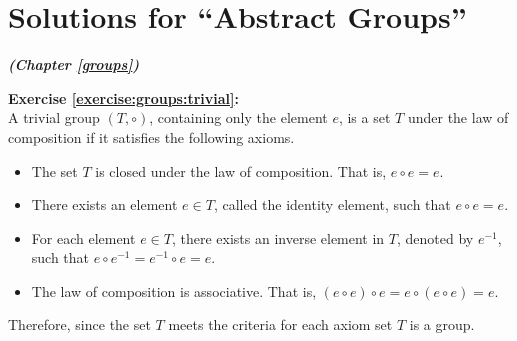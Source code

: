 
\section{Solutions for  ``Abstract Groups''}
\noindent\textbf{\textit{ (Chapter \ref{groups})}}\bigskip

\noindent\textbf{Exercise \ref{exercise:groups:trivial}:}
\\
A trivial group $(T, \circ )$, containing only the element $e$, is a set $T$ under the law of composition if it satisfies the following axioms. 

\begin{itemize}
\item
The set $T$ is closed under the law of composition.  That is, $e \circ e = e$.

\item
There exists an element $e \in T$, called the identity element, such that $e \circ e = e$.

\item
For each element $e \in T$, there exists an inverse element in $T$, denoted by $e^{-1}$, such that $e \circ e^{-1} = e^{-1} \circ e = e$.

\item
The law of composition is associative. That is, $(e \circ e) \circ e = e \circ (e \circ e) = e$.
\end{itemize}

Therefore, since the set $T$ meets the criteria for each axiom set $T$ is a group.
\\
\\

